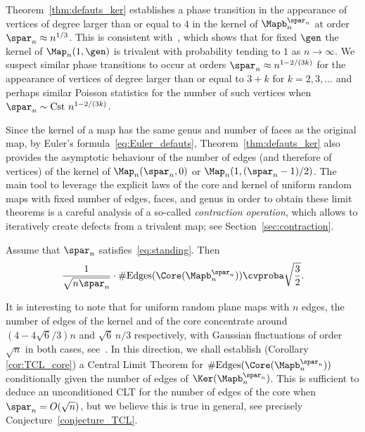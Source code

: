 \begin{remark}
Theorem~\ref{thm:defauts_ker} establishes a phase transition in the appearance of vertices of degree larger than or equal to $4$ in the kernel of $ \Mapb_n^{\spar_n}$ at order $ \spar_n \approx n^{1/3}$. This is consistent with~\cite[Lem.\,3]{Cha10}, which shows that for fixed $\gen$ the kernel of $ \Map_{n}(1,\gen)$ is trivalent with probability tending to $1$ as $n \rightarrow \infty$. We suspect similar phase transitions to occur at orders $ \spar_n \approx n^{1- 2/(3k)}$ for the appearance of vertices of degree larger than or equal to $3+k$ for $k = 2,3, \dots$ and perhaps similar Poisson statistics for the number of such vertices when $ \spar_n \sim \text{Cst } n^{1- 2/(3k)}$.
\end{remark}

Since the kernel of a map has the same genus and number of faces as the original map, by Euler's formula~\eqref{eq:Euler_defauts}, Theorem~\ref{thm:defauts_ker} also provides the asymptotic behaviour of the number of edges (and therefore of vertices) of the kernel of $ \Map_{n}(\spar_{n},0)$ or \hbox{$\Map_{n}(1, (\spar_{n}-1)/2)$}.
The main tool to leverage the explicit laws of the core and kernel of uniform random maps with fixed number of edges, faces, and genus in order to obtain these limit theorems is a careful analysis of a so-called \emph{contraction operation}, which allows to iteratively create defects from a trivalent map; see Section~\ref{sec:contraction}.

\begin{theorem}
\label{thm:aretes_core}
Assume that $\spar_n$ satisfies~\eqref{eq:standing}.
Then
\[
\frac{1}{\sqrt{n\spar_n}} \cdot \#\mathrm{Edges}(\Core(\Mapb_n^{\spar_{n}})) \cvproba \sqrt{\frac{3}{2}}.
\]
\end{theorem}

It is interesting to note that for uniform random plane maps with $n$ edges, the number of edges of the kernel and of the core concentrate around $(4-4 \sqrt{6}/3)n$ and $\sqrt{6}\,n/3$ respectively, with Gaussian fluctuations of order $\sqrt{n}$ in both cases, see~\cite[Th.\,5]{NR18}. In this direction, we shall establish (Corollary \ref{cor:TCL_core}) a Central Limit Theorem for $\#\mathrm{Edges}(\Core(\Mapb_n^{\spar_{n}}))$ conditionally given the number of edges of $\Ker(\Mapb_n^{\spar_{n}})$.
This is sufficient to deduce an unconditioned CLT for the number of edges of the core when $\spar_n = O(\sqrt{n})$, but we believe this is true in general, see precisely Conjecture~\ref{conjecture_TCL}.

